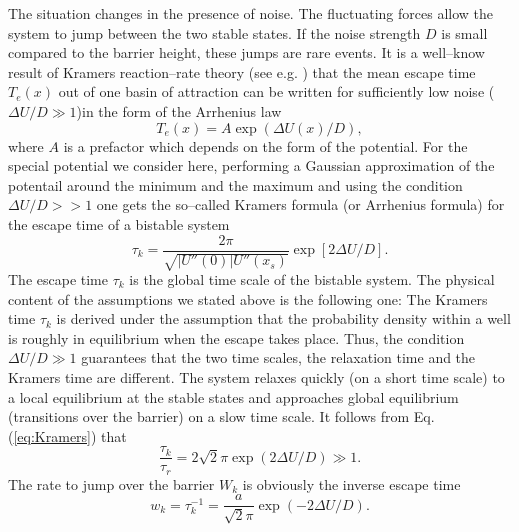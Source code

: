 The situation changes in the presence of noise. The fluctuating forces allow
the system to jump between the two stable states. If the noise strength $D$ 
is small compared to the barrier height, these jumps are rare events. 
It is a well--know result of Kramers reaction--rate theory (see e.g.
\cite{Haenggi:Kramers}) that the mean escape time $T_e(x)$ out of one basin of
attraction can be written for sufficiently low noise ($\Delta U/D \gg 1$)in 
the form of the Arrhenius law
\begin{equation}
  \label{eq:Arrhenius}
  T_e(x) = A \exp(\Delta U(x)/D),
\end{equation}
where $A$ is a prefactor which depends on the form of the potential. For the
special potential we consider here, performing a Gaussian approximation of the
potentail around the minimum and the maximum and using the condition
$\Delta U/ D >> 1$ one gets the so--called Kramers
formula (or Arrhenius formula) for the escape time of a bistable system
\begin{equation}
\label{eq:Kramers}
  \tau_k = \frac{2\pi}{\sqrt{|U''(0)|U''(x_s)}} \exp [ 2 \Delta U / D ].
\end{equation}
The escape time $\tau_k$ is the global time scale of the bistable system.
The physical content of the assumptions we stated above is the following
one: The Kramers time $\tau_k$ is derived under the assumption that the
probability density within a well is roughly in equilibrium when the escape
takes place. Thus, the condition $\Delta U/D \gg 1$ guarantees that the two
time scales, the relaxation time and the Kramers time are different. The
system relaxes quickly (on a short time scale) to a local equilibrium at the
stable states and approaches global equilibrium (transitions over the barrier)
on a slow time scale. It follows from Eq. (\ref{eq:Kramers}) that
\begin{equation}
  \frac{\tau_k}{\tau_r} = 2 \sqrt{2} \pi \exp(2 \Delta U /D) \gg 1.
\end{equation}
The rate to jump over the barrier $W_k$ is obviously the inverse escape time
\begin{equation}
  w_k = \tau_k^{-1} = \frac{a}{\sqrt{2} \pi} \exp(-2 \Delta U/D).
\end{equation}

